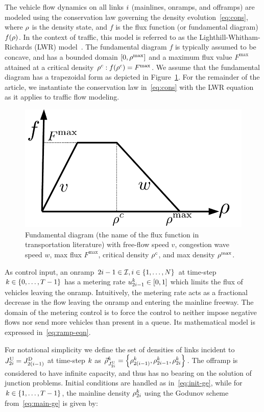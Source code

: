 The vehicle flow dynamics on all links $i$ (mainlines, onramps,
and offramps) are modeled using the conservation law governing the
density evolution~\eqref{eq:cons}, where $\rho$ is the
density state, and $f$ is the flux function (or fundamental diagram)
$f\left(\density\right)$. In the context of traffic, this model is
referred to as the Lighthill-Whitham-Richards (LWR) model~\cite{lighthill1955kinematic,richards1956shock}.
The fundamental diagram $f$ is typically assumed to be concave, and
has a bounded domain $\left[0,\density^{\max}\right]$ and a maximum
flux value $F^{\max}$ attained at a critical density $\density^{c}:f\left(\density^{c}\right)=F^{\max}$.
We assume that the fundamental diagram has a trapezoidal form as depicted
in Figure~\ref{fig:Fundamental-diagram-with}. For the remainder
of the article, we instantiate the conservation law in~\eqref{eq:cons}
with the LWR equation as it applies to traffic flow modeling.\begin{figure}%
\begin{centering}
\includegraphics[width=0.4\columnwidth]{figs-gen/fd}
\par\end{centering}

\caption{Fundamental diagram (the name of the flux function in transportation
literature) with free-flow speed $v$, congestion wave speed $w$,
max flux $F^{\max}$, critical density $\rho^{c}$, and max density
$\rho^{\max}$.\label{fig:Fundamental-diagram-with}}
\end{figure}%


As control input, an onramp $2\link-1\in\links,\link\in\intrange 1{\nlinks}$
at time-step $k\in\intrange 0{\ntime-1}$ has a metering rate $\ramp_{2\link-1}^{\tind}\in\left[0,1\right]$
which limits the flux of vehicles leaving the onramp. Intuitively,
the metering rate acts as a fractional decrease in the flow leaving
the onramp and entering the mainline freeway. The domain of the metering
control is to force the control to neither impose negative flows nor
send more vehicles than present in a queue. Its mathematical model
is expressed in~\eqref{eq:ramp-eqn}.

For notational simplicity we define the set of densities of links
incident to $\jup{2\link}=\jdown{2\left(\link-1\right)}$ at time-step
$k$ as $\juncstate{\jup{2\link}}{\tind}=\left\{ \discrete{2\left(\link-1\right)}{\tind},\discrete{2i-1}{\tind},\discrete{2\link}{\tind}\right\} $.
The offramp is considered to have infinite capacity, and thus has
no bearing on the solution of junction problems. Initial conditions
are handled as in~\eqref{eq:init-ge}, while for $k\in\intrange 1{\ntime-1}$,
the mainline density $\rho_{2i}^{k}$ using the Godunov
scheme from~\eqref{eq:main-ge} is given by:

